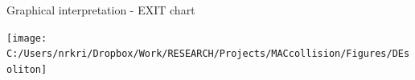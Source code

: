 \begin{frame}{Graphical interpretation - EXIT chart}
\begin{center}
\texttt{[image: C:/Users/nrkri/Dropbox/Work/RESEARCH/Projects/MACcollision/Figures/DEsoliton]}
\end{center}
\end{frame}
